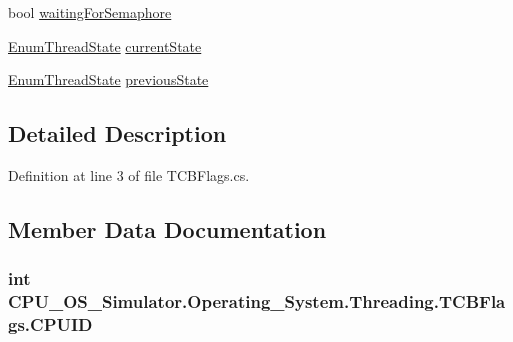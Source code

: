 \begin{DoxyCompactItemize}
\item 
bool \hyperlink{struct_c_p_u___o_s___simulator_1_1_operating___system_1_1_threading_1_1_t_c_b_flags_aaa09adaa90f9dece8ddebd92f64fc2ad}{waiting\+For\+Semaphore}
\item 
\hyperlink{namespace_c_p_u___o_s___simulator_1_1_operating___system_1_1_threading_af7d2481e1618940da9be7dcc5aff9472}{Enum\+Thread\+State} \hyperlink{struct_c_p_u___o_s___simulator_1_1_operating___system_1_1_threading_1_1_t_c_b_flags_a6d56b5aa10ffa27445688a465375968a}{current\+State}
\item 
\hyperlink{namespace_c_p_u___o_s___simulator_1_1_operating___system_1_1_threading_af7d2481e1618940da9be7dcc5aff9472}{Enum\+Thread\+State} \hyperlink{struct_c_p_u___o_s___simulator_1_1_operating___system_1_1_threading_1_1_t_c_b_flags_a0e03f44536385be5c75e138fda0566b0}{previous\+State}
\end{DoxyCompactItemize}


\subsection{Detailed Description}


Definition at line 3 of file T\+C\+B\+Flags.\+cs.



\subsection{Member Data Documentation}
\hypertarget{struct_c_p_u___o_s___simulator_1_1_operating___system_1_1_threading_1_1_t_c_b_flags_a4230e0b12707667e7b7a88d5e698abe7}{}
\subsubsection[{C\+P\+U\+I\+D}]{\setlength{\rightskip}{0pt plus 5cm}int C\+P\+U\+\_\+\+O\+S\+\_\+\+Simulator.\+Operating\+\_\+\+System.\+Threading.\+T\+C\+B\+Flags.\+C\+P\+U\+I\+D}\label{struct_c_p_u___o_s___simulator_1_1_operating___system_1_1_threading_1_1_t_c_b_flags_a4230e0b12707667e7b7a88d5e698abe7}



